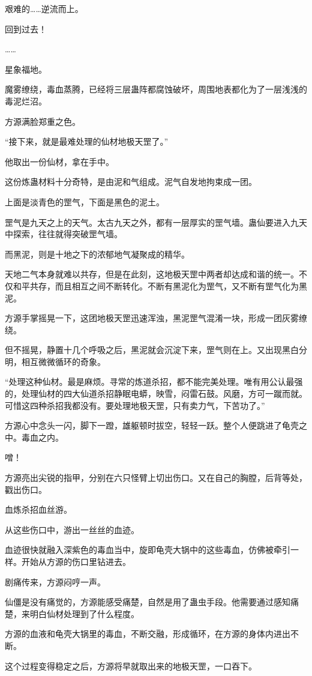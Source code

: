 \begin{this_body}
艰难的……逆流而上。

回到过去！

……

星象福地。

魔雾缭绕，毒血蒸腾，已经将三层蛊阵都腐蚀破坏，周围地表都化为了一层浅浅的毒泥烂沼。

方源满脸郑重之色。

“接下来，就是最难处理的仙材地极天罡了。”

他取出一份仙材，拿在手中。

这份炼蛊材料十分奇特，是由泥和气组成。泥气自发地拘束成一团。

上面是淡青色的罡气，下面是黑色的泥土。

罡气是九天之上的天气。太古九天之外，都有一层厚实的罡气墙。蛊仙要进入九天中探索，往往就得突破罡气墙。

而黑泥，则是十地之下的浓郁地气凝聚成的精华。

天地二气本身就难以共存，但是在此刻，这地极天罡中两者却达成和谐的统一。不仅和平共存，而且相互之间不断转化。不断有黑泥化为罡气，又不断有罡气化为黑泥。

方源手掌摇晃一下，这团地极天罡迅速浑浊，黑泥罡气混淆一块，形成一团灰雾缭绕。

但不摇晃，静置十几个呼吸之后，黑泥就会沉淀下来，罡气则在上。又出现黑白分明，相互微微循环的奇象。

“处理这种仙材。最是麻烦。寻常的炼道杀招，都不能完美处理。唯有用公认最强的，处理仙材的四大仙道杀招静眠电蟒，映雪，闷雷石鼓。风磨，方可一蹴而就。可惜这四种杀招我都没有。要处理地极天罡，只有卖力气，下苦功了。”

方源心中念头一闪，脚下一蹬，雄躯顿时拔空，轻轻一跃。整个人便跳进了龟壳之中。毒血之内。

噌！

方源亮出尖锐的指甲，分别在六只怪臂上切出伤口。又在自己的胸膛，后背等处，戳出伤口。

血炼杀招血丝游。

从这些伤口中，游出一丝丝的血迹。

血迹很快就融入深紫色的毒血当中，旋即龟壳大锅中的这些毒血，仿佛被牵引一样。开始从方源的伤口里钻进去。

剧痛传来，方源闷哼一声。

仙僵是没有痛觉的，方源能感受痛楚，自然是用了蛊虫手段。他需要通过感知痛楚，来明白仙材处理到了什么程度。

方源的血液和龟壳大锅里的毒血，不断交融，形成循环，在方源的身体内进出不断。

这个过程变得稳定之后，方源将早就取出来的地极天罡，一口吞下。


\end{this_body}
